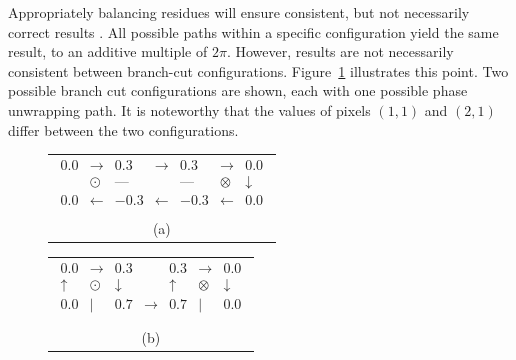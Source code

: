 Appropriately balancing residues will ensure consistent, but not necessarily correct results \cite{Bone1991}.  All possible paths within a specific configuration yield the same result, to an additive multiple of $2\pi$.  However, results are not necessarily consistent between branch-cut configurations.  Figure~\ref{fig:Branch_Cuts} illustrates this point.  Two possible branch cut configurations are shown, each with one possible phase unwrapping path.  It is noteworthy that the values of pixels $(1,1)$ and $(2,1)$ differ between the two configurations.

\begin{figure}[h]
\center

\begin{tabular}{@{}c@{}}
  
  $\begin{matrix}

0.0 &  \rightarrow  & 0.3  &  \rightarrow & 0.3  &  \rightarrow  & 0.0 \\
 & \odot & \textrm{---} &  & \textrm{---} & \otimes & \downarrow \\
0.0 & \leftarrow   & -0.3 & \leftarrow  & -0.3 &  \leftarrow  & 0.0 \\

\end{matrix}$

\\
\small (a)

\end{tabular}

\vspace{\floatsep}

\begin{tabular}{@{}c@{}}


$\begin{matrix}

0.0 &  \rightarrow  & 0.3  &  & 0.3  &  \rightarrow  & 0.0 \\
\uparrow & \odot & \downarrow &  & \uparrow & \otimes & \downarrow \\
0.0 & |   & 0.7 & \rightarrow  & 0.7 &  |  & 0.0 \\

\end{matrix}$

\\
\small (b)

\end{tabular}


\label{fig:Branch_Cuts}
\end{figure}


